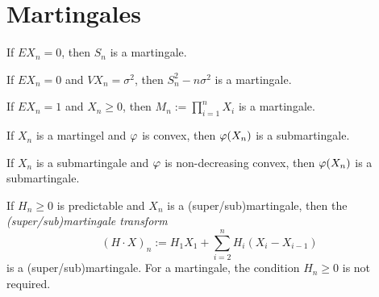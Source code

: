 \documentclass{../../large}
\begin{document}
\section{Martingales}

\begin{prb}
\begin{parts}
\item If $EX_n=0$, then $S_n$ is a martingale.
\item If $EX_n=0$ and $VX_n=\sigma^2$, then $S_n^2-n\sigma^2$ is a martingale.
\item If $EX_n=1$ and $X_n\ge0$, then $M_n:=\prod_{i=1}^nX_i$ is a martingale.
\item If $X_n$ is a martingel and $\varphi$ is convex, then $\varphi(X_n)$ is a submartingale.
\item If $X_n$ is a submartingale and $\varphi$ is non-decreasing convex, then $\varphi(X_n)$ is a submartingale.
\item If $H_n\ge0$ is predictable and $X_n$ is a (super/sub)martingale, then the \emph{(super/sub)martingale transform}
\[(H\cdot X)_n:=H_1X_1+\sum_{i=2}^nH_i(X_i-X_{i-1})\]
is a (super/sub)martingale.
For a martingale, the condition $H_n\ge0$ is not required.
\end{parts}
\end{prb}
\end{document}

